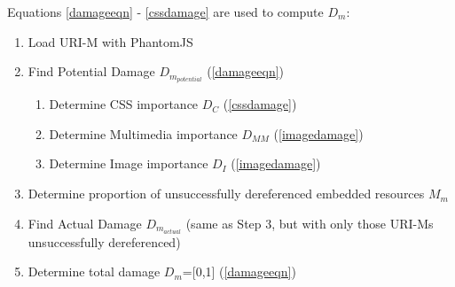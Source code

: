 


Equations \ref{damageeqn} - \ref{cssdamage} are used to compute $D_m$:

\begin{enumerate}
  \item Load URI-M with PhantomJS
  \item Find Potential Damage $D_{m_{potential}}$ (\ref{damageeqn})
  \begin{enumerate}
	\item Determine CSS importance $D_C$ (\ref{cssdamage})
	\item Determine Multimedia importance $D_{MM}$ (\ref{imagedamage})
	\item Determine Image importance $D_I$ (\ref{imagedamage})
  \end{enumerate}
  \item Determine proportion of unsuccessfully dereferenced embedded resources $M_m$
  \item Find Actual Damage $D_{m_{actual}}$ (same as Step 3, but with only those URI-Ms unsuccessfully dereferenced)
  \item Determine total damage $D_m$=[0,1] (\ref{damageeqn})
  \
\end{enumerate}


